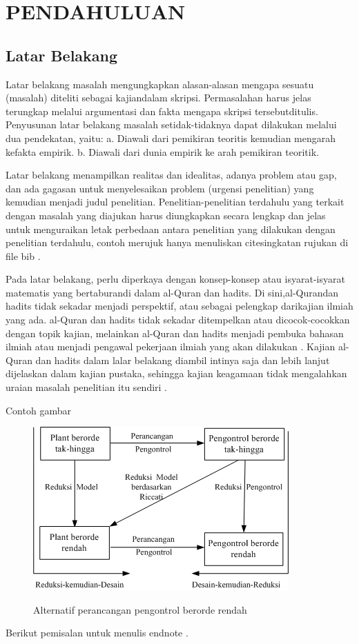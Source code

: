 \chapter{PENDAHULUAN}
\section{Latar Belakang}
Latar belakang masalah mengungkapkan alasan-alasan mengapa sesuatu (masalah) diteliti sebagai kajiandalam skripsi. Permasalahan harus jelas terungkap melalui argumentasi dan fakta mengapa skripsi tersebutditulis. Penyusunan latar belakang masalah setidak-tidaknya dapat dilakukan melalui dua pendekatan, yaitu:
a. Diawali dari pemikiran teoritis kemudian mengarah kefakta empirik.
b. Diawali dari dunia empirik ke arah pemikiran teoritik.

Latar belakang menampilkan realitas dan idealitas, adanya problem atau gap, dan ada gagasan untuk menyelesaikan problem (urgensi penelitian) yang kemudian menjadi judul penelitian. Penelitian-penelitian terdahulu yang terkait dengan masalah yang diajukan harus diungkapkan secara lengkap dan jelas untuk menguraikan letak perbedaan antara penelitian yang dilakukan dengan penelitian terdahulu, contoh merujuk hanya menuliskan cite{singkatan rujukan di file bib} \cite{Pernebo}.

Pada latar belakang, perlu diperkaya dengan konsep-konsep atau isyarat-isyarat matematis yang bertaburandi dalam al-Quran dan hadits. Di sini,al-Qurandan hadits tidak sekadar menjadi perspektif, atau sebagai pelengkap darikajian ilmiah yang ada. al-Quran dan hadits tidak sekadar ditempelkan atau dicocok-cocokkan dengan topik kajian, melainkan al-Quran dan hadits menjadi pembuka bahasan ilmiah atau menjadi pengawal pekerjaan ilmiah yang akan dilakukan \cite{GCP89}. Kajian al-Quran dan hadits dalam lalar belakang diambil intinya saja dan lebih lanjut dijelaskan dalam kajian pustaka, sehingga kajian keagamaan tidak mengalahkan uraian masalah penelitian itu sendiri \cite{Moore}. 

Contoh gambar
\begin{figure}[htb]
\centering
\includegraphics[scale=0.7]{assets/pict/reduksi_design.png}\\
\caption{Alternatif perancangan pengontrol berorde rendah}\label{desain}
\end{figure}
Berikut pemisalan untuk menulis endnote \cite{CZ95}.
